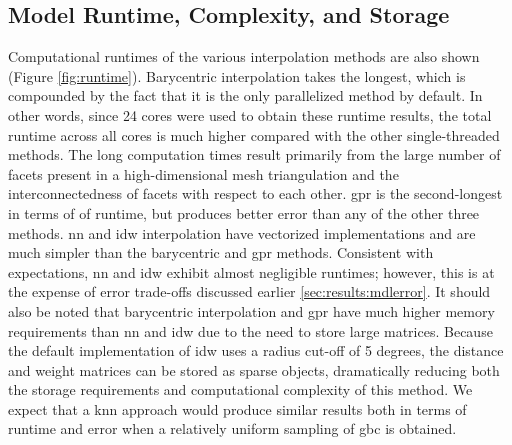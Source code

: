 \documentclass[preprint,12pt]{elsarticle}
\begin{document}
\subsection{Model Runtime, Complexity, and Storage}
Computational runtimes of the various interpolation methods are also shown (Figure \ref{fig:runtime}). Barycentric interpolation takes the longest, which is compounded by the fact that it is the only parallelized method by default. In other words, since 24 cores were used to obtain these runtime results, the total runtime across all cores is much higher compared with the other single-threaded methods. The long computation times result primarily from the large number of facets present in a high-dimensional mesh triangulation and the interconnectedness of facets with respect to each other. \Gls{gpr} is the second-longest in terms of of runtime, but produces better error than any of the other three methods. \Gls{nn} and \gls{idw} interpolation have vectorized implementations and are much simpler than the barycentric and \gls{gpr} methods. Consistent with expectations, \gls{nn} and \gls{idw} exhibit almost negligible runtimes; however, this is at the expense of error trade-offs discussed earlier \ref{sec:results:mdlerror}. It should also be noted that barycentric interpolation and \gls{gpr} have much higher memory requirements than \gls{nn} and \gls{idw} due to the need to store large matrices. Because the default implementation of \gls{idw} uses a radius cut-off of 5 degrees, the distance and weight matrices can be stored as sparse objects, dramatically reducing both the storage requirements and computational complexity of this method. We expect that a \gls{knn} approach would produce similar results both in terms of runtime and error when a relatively uniform sampling of \gls{gbc} is obtained.
\end{document}
